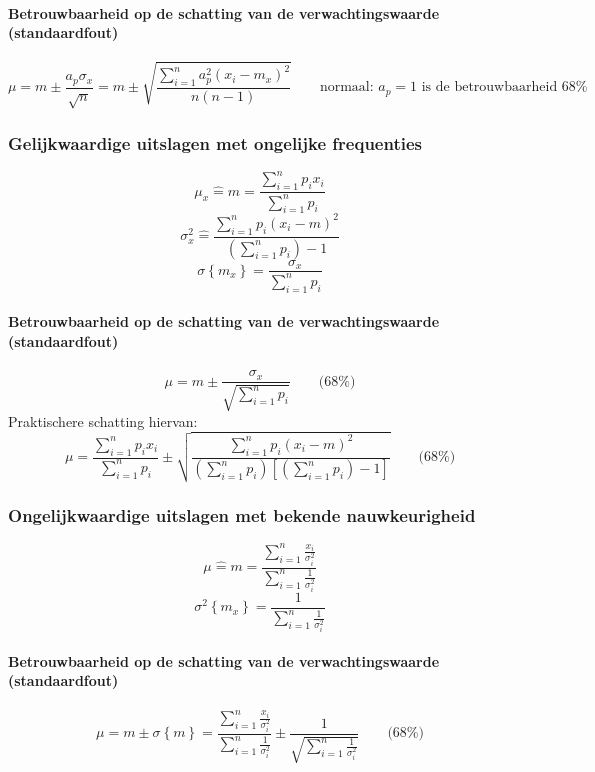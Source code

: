       \paragraph{Betrouwbaarheid op de schatting van de verwachtingswaarde (standaardfout)}
        \[
          \mu = m \pm \frac{a_p\sigma_x}{\sqrt{n}} %
              = m \pm \sqrt{\frac{\sum_{i=1}^n a_p^2\left(x_i - m_x\right)^2}{n\left(n-1\right)}} \qquad \mbox{normaal: $a_p = 1$ is de betrouwbaarheid 68\%}
        \]
    \subsubsection{Gelijkwaardige uitslagen met ongelijke frequenties}
    \label{sec:SteekproeftheorieGeljkwaardigeUitslagenOngelijkeFrequenties}
      \[
        \mu_x \hat{=} m = \frac{\sum_{i=1}^{n} p_i x_i}{\sum_{i=1}^{n} p_i}
      \]
      \[
        \sigma_x^2 \hat{=} \frac{\sum_{i=1}^n p_i \left(x_i-m\right)^2}{\left(\sum_{i=1}^{n} p_i\right) - 1}
      \]
      \[
        \sigma\left\{m_x\right\} = \frac{\sigma_x}{\sum_{i=1}^n p_i}
      \]
      \paragraph{Betrouwbaarheid op de schatting van de verwachtingswaarde (standaardfout)}
        \[
          \mu = m \pm \frac{\sigma_x}{\sqrt{\sum_{i=1}^n p_i}} \qquad \mbox{(68\%)}
        \] 
        Praktischere schatting hiervan:
        \[
          \mu = \frac{\sum_{i=1}^{n} p_i x_i}{\sum_{i=1}^{n} p_i}
                \pm
                \sqrt{\frac{\sum_{i=1}^n p_i \left(x_i-m\right)^2}{\left(\sum_{i=1}^{n} p_i\right)\left[\left(\sum_{i=1}^{n} p_i\right) - 1\right]}}
                \qquad \mbox{(68\%)}
        \] 
    \subsubsection{Ongelijkwaardige uitslagen met bekende nauwkeurigheid}
    \label{sec:SteekproeftheorieONGeljkwaardigeUitslagenNauwkeurigheid}
      \[
        \mu \hat{=} m = \frac{\sum_{i=1}^n \frac{x_i}{\sigma_i^2}}{\sum_{i=1}^n \frac{1}{\sigma_i^2}}
      \]
      \[
        \sigma^2\left\{m_x\right\} = \frac{1}{\sum_{i=1}^n \frac{1}{\sigma_i^2}}
      \]
      \paragraph{Betrouwbaarheid op de schatting van de verwachtingswaarde (standaardfout)}
      \[
        \mu = m \pm \sigma\left\{m\right\} 
            = \frac{\sum_{i=1}^n \frac{x_i}{\sigma_i^2}}{\sum_{i=1}^n \frac{1}{\sigma_i^2}} 
              \pm \frac{1}{\sqrt{\sum_{i=1}^n \frac{1}{\sigma_i^2}}}
              \qquad \mbox{(68\%)}
      \]
